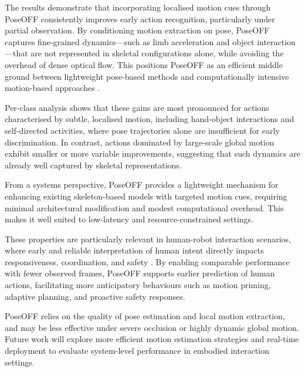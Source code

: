 \documentclass[letterpaper, 10 pt, conference]{ieeeconf}
\begin{document}
The results demonstrate that incorporating localised motion cues through PoseOFF consistently improves early action recognition, particularly under partial observation. By conditioning motion extraction on pose, PoseOFF captures fine-grained dynamics—such as limb acceleration and object interaction—that are not represented in skeletal configurations alone, while avoiding the overhead of dense optical flow. This positions PoseOFF as an efficient middle ground between lightweight pose-based methods \cite{yan2018SpatialTemporalGraphConvolutionalNetworksSkeletonBasedActionRecognition, shi2019SkeletonBasedActionRecognitionDirectedGraphNeuralNetworks} and computationally intensive motion-based approaches \cite{simonyan2014TwoStreamConvolutionalNetworksActionRecognitionVideos}.

Per-class analysis shows that these gains are most pronounced for actions characterised by subtle, localised motion, including hand-object interactions and self-directed activities, where pose trajectories alone are insufficient for early discrimination. In contrast, actions dominated by large-scale global motion exhibit smaller or more variable improvements, suggesting that such dynamics are already well captured by skeletal representations.

From a systems perspective, PoseOFF provides a lightweight mechanism for enhancing existing skeleton-based models with targeted motion cues, requiring minimal architectural modification and modest computational overhead. This makes it well suited to low-latency and resource-constrained settings.

These properties are particularly relevant in human-robot interaction scenarios, where early and reliable interpretation of human intent directly impacts responsiveness, coordination, and safety \cite{dragan2013Legibilitypredictabilityrobotmotion, lasota2017SurveyMethodsSafeHumanRobotInteraction}. By enabling comparable performance with fewer observed frames, PoseOFF supports earlier prediction of human actions, facilitating more anticipatory behaviours such as motion priming, adaptive planning, and proactive safety responses.

PoseOFF relies on the quality of pose estimation and local motion extraction, and may be less effective under severe occlusion or highly dynamic global motion. Future work will explore more efficient motion estimation strategies and real-time deployment to evaluate system-level performance in embodied interaction settings.


\end{document}
